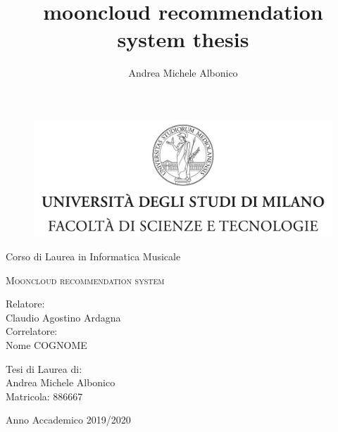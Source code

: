 \documentclass[12pt,fleqn,twoside,a4paper]{book}
\title{mooncloud recommendation system thesis}
\author{Andrea Michele Albonico}
\begin{document}
\frontmatter

\begin{titlepage}
    \begin{figure}
    	\centering
    	\includegraphics[height=5.0 cm]{logo.jpg}
    	\vspace{0.5 cm}
    \end{figure}
    \begin{center}
        {\Large Corso di Laurea in Informatica Musicale}
    \end{center}
    
    \begin{center}
        \vspace{3 cm}
        {\Large \textsc{Mooncloud recommendation system} }
    \end{center}
    \par
    \vspace{3 cm}
    \begin{flushleft}
        Relatore:\\ Claudio Agostino Ardagna\\
        \noindent Correlatore:\\ Nome COGNOME
    \end{flushleft}
    \vspace{1 cm}
    \begin{flushright}
        Tesi di Laurea di:\\ Andrea Michele Albonico\\ Matricola: 886667
    \end{flushright}
    \vfill
    \begin{center}
    	{\Large Anno Accademico 2019/2020}
    \end{center}
\end{titlepage}





\tableofcontents
\listoffigures
\end{document}
